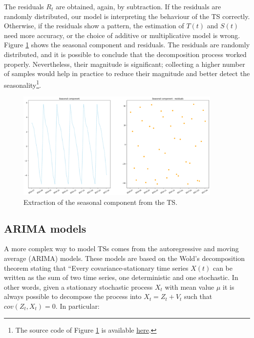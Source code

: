 The residuals $R_t$ are obtained, again, by subtraction. If the residuals are randomly distributed, our model is interpreting the behaviour of the TS correctly. Otherwise, if the residuals show a pattern,  the estimation of $T(t)$ and $S(t)$ need more accuracy, or the choice of additive or multiplicative model is wrong. Figure \ref{fig_extractedSeasonality} shows the seasonal component and residuals. The residuals are randomly distributed, and it is possible to conclude that the decomposition process worked properly. Nevertheless, their magnitude is significant; collecting a higher number of samples would help in practice to reduce their magnitude and better detect the seasonality\footnote{The source code of Figure \ref{fig_extractedSeasonality} is available \href{https://github.com/aletuf93/logproj/blob/master/examples/03.\%20Statistics.ipynb}{here}.}.

\begin{figure}[hbt!]
\centering
\includegraphics[width=0.9\textwidth]{SectionLetsMath/elemStat_figures/fig_extractedSeasonality.png}
\captionsetup{type=figure}
\caption{Extraction of the seasonal component from the TS.}
\label{fig_extractedSeasonality}
\end{figure}

\subsection{ARIMA models} \label{secARIMA}

A more complex way to model TSs comes from the autoregressive and moving average (ARIMA) models. These models are based on the Wold’s decomposition theorem stating that “Every covariance-stationary time series $X(t)$ can be written as the sum of two time series, one deterministic and one stochastic. In other words, given a stationary stochastic process $X_t$ with mean value $\mu$ it is always possible to decompose the process into $X_t=Z_t+V_t$ such that $cov\left(Z_t,X_t\right)=0$. In particular:

